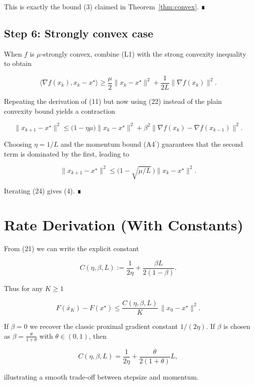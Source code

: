 \documentclass{article}
\begin{document}
This is exactly the bound (3) claimed in Theorem~\ref{thm:convex}. ∎

\subsection*{Step 6: Strongly convex case}
When $f$ is $\mu$‑strongly convex, combine (L1) with the strong convexity inequality to obtain  

\[
\langle\nabla f(x_k),x_k-x^\star\rangle\ge \frac{\mu}{2}\|x_k-x^\star\|^2+\frac{1}{2L}\|\nabla f(x_k)\|^2. \tag{22}
\]

Repeating the derivation of (11) but now using (22) instead of the plain convexity bound yields a contraction  

\[
\|x_{k+1}-x^\star\|^2 \le \bigl(1-\eta\mu\bigr)\|x_k-x^\star\|^2
     +\beta^2\|\nabla f(x_k)-\nabla f(x_{k-1})\|^2 . \tag{23}
\]

Choosing $\eta=1/L$ and the momentum bound (A4$^\prime$) guarantees that the second term is dominated by the first, leading to  

\[
\|x_{k+1}-x^\star\|^2 \le \bigl(1-\sqrt{\mu/L}\,\bigr)\|x_k-x^\star\|^2 . \tag{24}
\]

Iterating (24) gives (4). ∎

\section*{Rate Derivation (With Constants)}
From (21) we can write the explicit constant  

\[
C(\eta,\beta,L):=\frac{1}{2\eta}+\frac{\beta L}{2(1-\beta)} .
\]

Thus for any $K\ge1$

\[
F(\bar{x}_K)-F(x^\star)\le \frac{C(\eta,\beta,L)}{K}\,\|x_0-x^\star\|^2 .
\]

If $\beta=0$ we recover the classic proximal gradient constant $1/(2\eta)$.  
If $\beta$ is chosen as $\beta=\frac{\theta}{1+\theta}$ with $\theta\in(0,1)$, then  

\[
C(\eta,\beta,L)=\frac{1}{2\eta}+\frac{\theta}{2(1+\theta)}L,
\]

illustrating a smooth trade‑off between stepsize and momentum.
\end{document}
